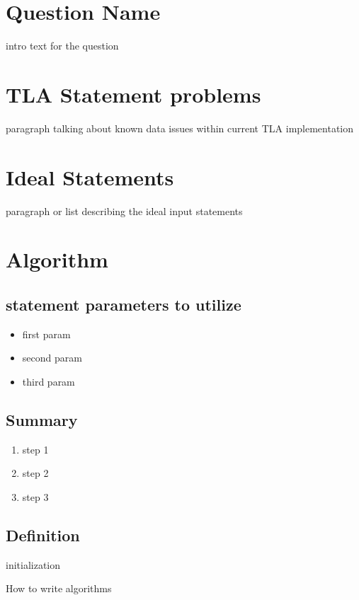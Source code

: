 \documentclass{article}
\begin{document}
\section*{Question Name}
intro text for the question

\section{TLA Statement problems}
paragraph talking about known data issues within current TLA implementation

\section{Ideal Statements}
paragraph or list describing the ideal input statements
\section{Algorithm}
\subsection{statement parameters to utilize}

\begin{itemize}
  \item first param
  \item second param
  \item third param
  \end{itemize}
\subsection{Summary}
\begin{enumerate}
  \item step 1
  \item step 2
  \item step 3
  \end{enumerate}

  \subsection{Definition}
  \begin{algorithm}[H]
    \SetAlgoLined
    initialization\;
    \caption{How to write algorithms}
  \end{algorithm}
\end{document}
